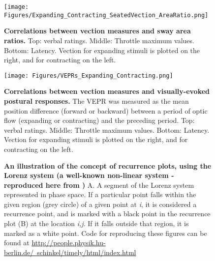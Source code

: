 \documentclass[11pt]{article}
\begin{document}
\begin{figure}[!ht]
\begin{center}
\texttt{[image: Figures/Expanding\_Contracting\_SeatedVection\_AreaRatio.png]}
\end{center}
\caption{{\bf Correlations between vection measures and sway area ratios.} Top: verbal ratings. Middle: Throttle maximum values. Bottom: Latency. Vection for expanding stimuli is plotted on the right, and for contracting on the left.}
\label{Area_Ratios}
\end{figure}


\begin{figure}[!ht]
\begin{center}
\texttt{[image: Figures/VEPRs\_Expanding\_Contracting.png]}
\end{center}
\caption{{\bf Correlations between vection measures and visually-evoked postural responses.} The VEPR was measured as the mean position difference (forward or backward) between a period of optic flow (expanding or contracting) and the preceding period. Top: verbal ratings. Middle: Throttle maximum values. Bottom: Latency. Vection for expanding stimuli is plotted on the right, and for contracting on the left.}
\label{VEPRs}
\end{figure}


\begin{figure}[!ht]
\begin{center}
\end{center}
\caption{{\bf An illustration of the concept of recurrence plots, using the Lorenz system (a well-known non-linear system - reproduced here from \cite{Schinkel:2009ex})} A. A segment of the Lorenz system represented in phase space. If a particular point falls within the given region (grey circle) of a given point at \textit{i}, it is considered a recurrence point, and is marked with a black point in the recurrence plot (B) at the location \textit{i,j}. If it falls outside that region, it is marked as a white point. Code for reproducing these figures can be found at \href{http://people.physik.hu-berlin.de/~schinkel/timely/html/index.html}{http://people.physik.hu-berlin.de/~schinkel/timely/html/index.html}}
\label{RP_illustration}
\end{figure}
\end{document}
